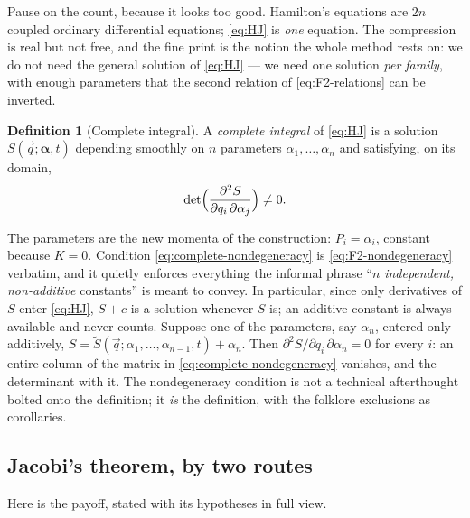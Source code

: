 \documentclass[11pt]{article}
\theoremstyle{plain}
\theoremstyle{definition}
\newtheorem{definition}[theorem]{Definition}
\theoremstyle{remark}
\newcommand{\vq}{\vec{q}}
\begin{document}
Pause on the count, because it looks too good. Hamilton's
equations are $2n$ coupled ordinary differential equations;
\eqref{eq:HJ} is \emph{one} equation. The compression is real but not
free, and the fine print is the notion the whole method rests on: we do
not need the general solution of \eqref{eq:HJ} --- we need one solution
\emph{per family}, with enough parameters that the second relation of
\eqref{eq:F2-relations} can be inverted.

\begin{definition}[Complete integral]
\label{def:complete-integral}
A \emph{complete integral} of \eqref{eq:HJ} is a solution
$S(\vq; \boldsymbol{\alpha}, t)$ depending smoothly on $n$ parameters
$\alpha_1, \dots, \alpha_n$ and satisfying, on its domain,
\begin{equation}
  \det\Bigl(\frac{\partial^2 S}
                 {\partial q_i\,\partial\alpha_j}\Bigr) \ne 0 .
  \label{eq:complete-nondegeneracy}
\end{equation}
\end{definition}

The parameters are the new momenta of the construction:
$P_i = \alpha_i$, constant because $K = 0$. Condition
\eqref{eq:complete-nondegeneracy} is
\eqref{eq:F2-nondegeneracy} verbatim, and it quietly enforces
everything the informal phrase ``$n$ \emph{independent, non-additive}
constants'' is meant to convey. In particular, since only derivatives
of $S$ enter \eqref{eq:HJ}, $S + c$ is a solution whenever $S$ is; an
additive constant is always available and never counts. Suppose one of
the parameters, say $\alpha_n$, entered only additively,
$S = \tilde S(\vq; \alpha_1, \dots, \alpha_{n-1}, t) + \alpha_n$. Then
$\partial^2 S/\partial q_i\,\partial\alpha_n = 0$ for every $i$: an
entire column of the matrix in \eqref{eq:complete-nondegeneracy}
vanishes, and the determinant with it. The nondegeneracy condition is
not a technical afterthought bolted onto the definition; it \emph{is}
the definition, with the folklore exclusions as corollaries.

\subsection{Jacobi's theorem, by two routes}
\label{sec:hj-jacobi}

Here is the payoff, stated with its hypotheses in full view.
\end{document}
